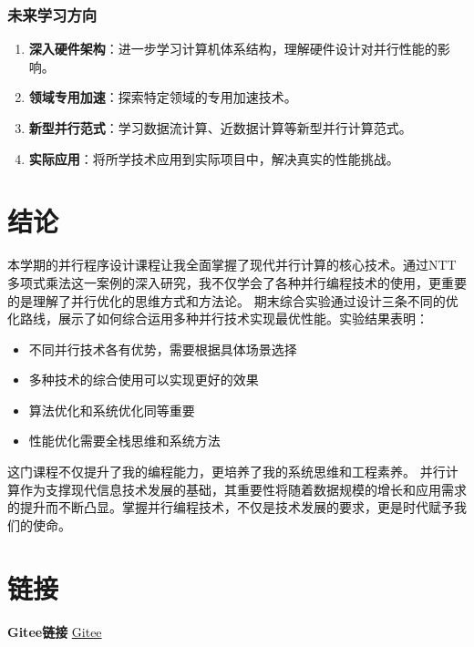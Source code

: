 \documentclass[a4paper]{article}
\begin{document}
	\subsubsection{未来学习方向}
	\begin{enumerate}
		\item \textbf{深入硬件架构}：进一步学习计算机体系结构，理解硬件设计对并行性能的影响。
		\item \textbf{领域专用加速}：探索特定领域的专用加速技术。
		
		\item \textbf{新型并行范式}：学习数据流计算、近数据计算等新型并行计算范式。
		
		\item \textbf{实际应用}：将所学技术应用到实际项目中，解决真实的性能挑战。
	\end{enumerate}
	\section{结论}
	本学期的并行程序设计课程让我全面掌握了现代并行计算的核心技术。通过NTT多项式乘法这一案例的深入研究，我不仅学会了各种并行编程技术的使用，更重要的是理解了并行优化的思维方式和方法论。
	期末综合实验通过设计三条不同的优化路线，展示了如何综合运用多种并行技术实现最优性能。实验结果表明：
	\begin{itemize}
		\item 不同并行技术各有优势，需要根据具体场景选择
		\item 多种技术的综合使用可以实现更好的效果
		\item 算法优化和系统优化同等重要
		\item 性能优化需要全栈思维和系统方法
	\end{itemize}
	这门课程不仅提升了我的编程能力，更培养了我的系统思维和工程素养。
	并行计算作为支撑现代信息技术发展的基础，其重要性将随着数据规模的增长和应用需求的提升而不断凸显。掌握并行编程技术，不仅是技术发展的要求，更是时代赋予我们的使命。
	
	\section{链接}
	\textbf{Gitee链接}  \href{https://gitee.com/sky_whale/parallel-programming-with-nku}{Gitee}
	
	
\end{document}
